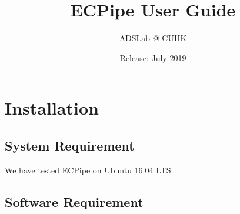 \documentclass[letterpaper,12pt]{article}
\title{{\bf ECPipe User Guide}}
\author{ADSLab @ CUHK}
\date{Release: July 2019\\}
\newcommand{\sysname}{{\sf\small ECPipe}\xspace}
\begin{document}
\maketitle


\tableofcontents

\clearpage
\section{Installation}
\label{sec:installation}

\subsection{System Requirement}

We have tested \sysname on Ubuntu 16.04 LTS.


\subsection{Software Requirement}
\end{document}

